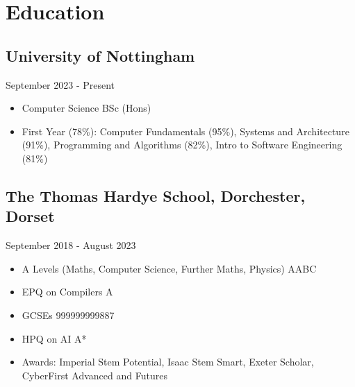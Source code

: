 \section{Education}
\subsection{University of Nottingham}{}{September 2023 - Present}
\begin{itemize}
    \item Computer Science BSc (Hons)
    \item First Year (78\%): \hfill Computer Fundamentals (95\%), Systems and Architecture (91\%), \newline \phantom{.} \hfill Programming and Algorithms (82\%), Intro to Software Engineering (81\%)
\end{itemize}
\vspace{.1em}
\subsection{The Thomas Hardye School, Dorchester, Dorset}{}{September 2018 - August 2023}
\begin{itemize}
\item A Levels (Maths, Computer Science, Further Maths, Physics) \hfill AABC
\item EPQ on Compilers \hfill A
\item GCSEs \hfill 999999999887
\item HPQ on AI \hfill {A*}
\item Awards: \hfill Imperial Stem Potential, Isaac Stem Smart, Exeter Scholar, CyberFirst Advanced and Futures
\end{itemize}


\vspace{.3em}

